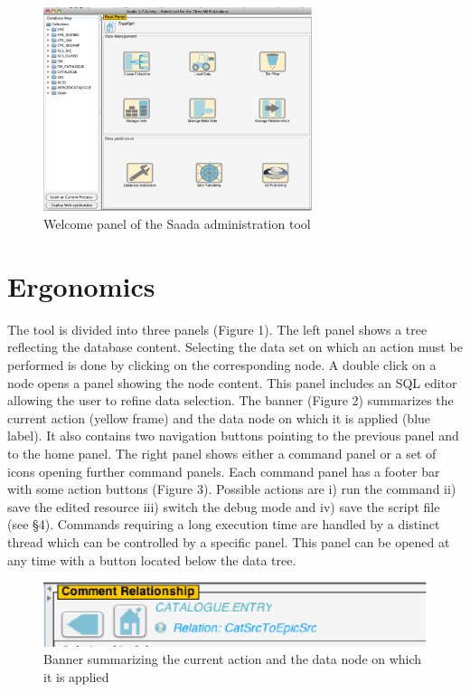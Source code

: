 \begin{figure}[!ht]
	\begin{center}
		\includegraphics[width=0.70\textwidth]{part8/MICHEL_P18/P18_fig1.eps}
	\end{center}
	\caption{Welcome panel of the Saada administration tool}
	\label{fig:fig1}
\end{figure}

\section{Ergonomics}
The tool is divided into three panels (Figure 1). The left panel shows a tree reflecting the database content. Selecting the data set on which an action must be performed is done by clicking on the corresponding node. A double click on a node opens a panel showing the node content. This panel includes an SQL editor allowing the user to refine data selection. The banner (Figure 2)  summarizes the current action (yellow frame) and the data node on which it is applied (blue label). It also contains two navigation buttons pointing to the previous panel and to the home panel. The right panel shows either a command panel or a set of icons opening further command panels. Each command panel has a footer bar with some action buttons (Figure 3). Possible actions are i) run the command ii) save the edited resource iii) switch the debug mode and iv) save the script file (see \S 4). Commands requiring a long execution time are handled by a distinct thread which can be controlled by a specific panel. This panel can be opened at any time with a button located below the data tree.

\begin{figure}[!ht]
	\begin{center}
		\includegraphics[height=0.10\textwidth]{part8/MICHEL_P18/P18_fig2.eps}
	\end{center}
	\caption{Banner summarizing the current action and the data node on which it is applied}
	\label{fig:fig2}
\end{figure}

